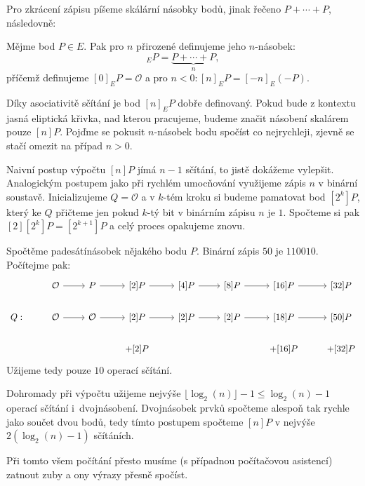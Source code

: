 \documentclass[12pt]{report}
\begin{document}
Pro zkrácení zápisu píšeme skálární násobky bodů, jinak řečeno $P+\cdots+P$, následovně:

\begin{definice}
Mějme bod $P \in E$. Pak pro $n$ přirozené definujeme jeho $n$-násobek:
\begin{equation*}
[n]_E P = \underbrace{P+ \cdots + P}_{n},
\end{equation*}
příčemž definujeme $[0]_E P = \mathcal{O}$ a pro $n < 0: [n]_E P = [-n]_E (-P)$.
\end{definice}

Díky asociativitě sčítání je bod $[n]_EP$ dobře definovaný. Pokud bude z kontextu jasná eliptická křivka, nad kterou pracujeme, budeme značit násobení skalárem pouze $[n]P$. Pojďme se pokusit $n$-násobek bodu spočíst co nejrychleji, zjevně se stačí omezit na případ $n > 0$.

Naivní postup výpočtu $[n] P$ jímá $n-1$ sčítání, to jistě dokážeme vylepšit. Analogickým postupem jako při rychlém umocňování využijeme zápis $n$ v binární soustavě. Inicializujeme $Q = \mathcal{O}$ a v $k$-tém kroku si budeme pamatovat bod $[2^k] P$, který ke $Q$ přičteme jen pokud $k$-tý bit v binárním zápisu $n$ je $1$. Spočteme si pak $[2][2^k] P = [2^{k+1}] P$ a celý proces opakujeme znovu.

\begin{priklad}
Spočtěme padesátínásobek nějakého bodu $P$. Binární zápis $50$ je $110010$. Počítejme pak:
\begin{equation*}
\begin{tikzcd}[arrows=to]
& \mathcal{O} \rar & P \rar & {[2]}P \rar & {[4]}P \rar & {[8]}P \rar & {[16]}P \rar & {[32]} P   \\
Q: &   \mathcal{O} \rar & \mathcal{O} \rar & {[2]}P \rar & {[2]}P \rar & {[2]}P \rar & {[18]}P \rar & {[50]} P   \\
 &  &  & + {[2]}P  & & & + {[16]}P  & +{[32]}P 
    \end{tikzcd} 
\end{equation*}
Užijeme tedy pouze $10$ operací sčítání.
\end{priklad}
 

Dohromady při výpočtu užijeme nejvýše $\lfloor \log_2(n) \rfloor -1 \leqslant \log_2(n)-1$ operací sčítání i~dvojnásobení. Dvojnásobek prvků spočteme alespoň tak rychle jako součet dvou bodů, tedy tímto postupem spočteme $[n]P$ v nejvýše $2( \log_2(n)-1)$ sčítáních.

Při tomto všem počítání přesto musíme (s případnou počítačovou asistencí) zatnout zuby a ony výrazy přesně spočíst.
\end{document}
